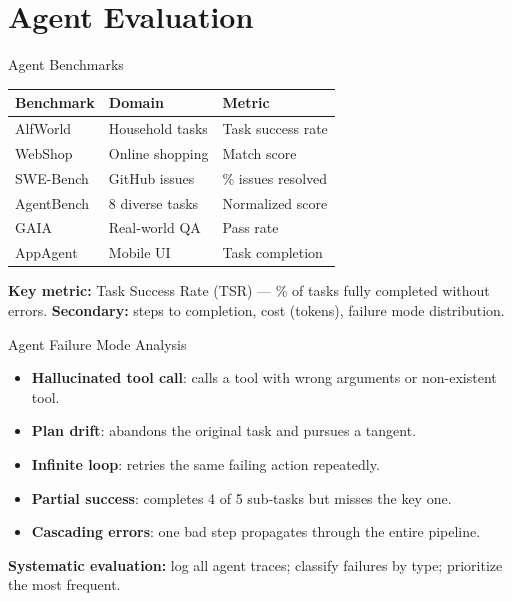 \documentclass[aspectratio=169,10pt]{beamer}
\begin{document}
\section{Agent Evaluation}

\begin{frame}{Agent Benchmarks}
  \begin{center}
  \begin{tabular}{lll}
    \toprule
    \textbf{Benchmark} & \textbf{Domain} & \textbf{Metric} \\
    \midrule
    AlfWorld & Household tasks & Task success rate \\
    WebShop & Online shopping & Match score \\
    SWE-Bench & GitHub issues & \% issues resolved \\
    AgentBench & 8 diverse tasks & Normalized score \\
    GAIA & Real-world QA & Pass rate \\
    AppAgent & Mobile UI & Task completion \\
    \bottomrule
  \end{tabular}
  \end{center}
  \vspace{0.4em}
  \textbf{Key metric:} Task Success Rate (TSR) — \% of tasks fully completed without errors.
  \textbf{Secondary:} steps to completion, cost (tokens), failure mode distribution.
\end{frame}

\begin{frame}{Agent Failure Mode Analysis}
  \begin{tcolorbox}[alertbox, title=Common Agent Failure Modes]
    \begin{itemize}
      \item \textbf{Hallucinated tool call}: calls a tool with wrong arguments or non-existent tool.
      \item \textbf{Plan drift}: abandons the original task and pursues a tangent.
      \item \textbf{Infinite loop}: retries the same failing action repeatedly.
      \item \textbf{Partial success}: completes 4 of 5 sub-tasks but misses the key one.
      \item \textbf{Cascading errors}: one bad step propagates through the entire pipeline.
    \end{itemize}
  \end{tcolorbox}
  \vspace{0.3em}
  \textbf{Systematic evaluation:} log all agent traces; classify failures by type; prioritize the most frequent.
\end{frame}
\end{document}
